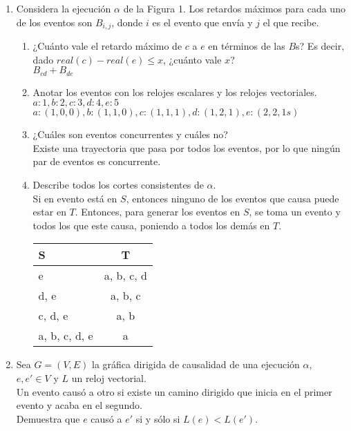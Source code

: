 \documentclass[12pt,a4paper]{report}
\begin{document}
\begin{enumerate}
	\item {
		Considera la ejecución $\alpha$ de la Figura 1. Los retardos máximos
		para cada uno de los eventos son $B_{i, j}$, donde $i$ es el evento
		que envía y $j$ el que recibe.
		\begin{enumerate}
			\item {
				¿Cuánto vale el retardo máximo de $c$ a $e$ en términos de
				las $B$s? Es decir, dado $real(c)-real(e) \leq x$, ¿cuánto
				vale $x$?\\
				$B_{cd} + B_{de}$
			}

			\item {
				Anotar los eventos con los relojes escalares y los relojes
				vectoriales.\\
				$a:1, b:2, c:3, d:4, e:5$\\
				$a:(1, 0, 0), b:(1, 1, 0), c:(1, 1, 1), d:(1, 2, 1), e:(2, 2, 1s)$
			}

			\item {
				¿Cuáles son eventos concurrentes y cuáles no?\\
				Existe una trayectoria que pasa por todos los eventos, por
				lo que ningún par de eventos es concurrente.
			}

			\item {
				Describe todos los cortes consistentes de $\alpha$.\\
				Si en evento está en $S$, entonces ninguno de los eventos
				que causa puede estar en $T$. Entonces, para generar los
				eventos en $S$, se toma un evento y todos los que este causa,
				poniendo a todos los demás en $T$.\\
				\begin{tabular}{| l | c |}
					\hline
						S & T \\ \hline
						e & a, b, c, d \\ \hline
						d, e & a, b, c \\ \hline
					    c, d, e & a, b \\ \hline
					    a, b, c, d, e & a \\
					\hline
				\end{tabular}
			}
		\end{enumerate}
	}

	\item {
		Sea $G = (V, E)$ la gráfica dirigida de causalidad de una ejecución
		$\alpha$, $e, e' \in V$ y $L$ un reloj vectorial.\\
		Un evento causó a otro si existe un camino dirigido que inicia en
		el primer evento y acaba en el segundo.\\
		Demuestra que $e$ causó a $e'$ si y sólo si $L(e) < L(e')$.
	}


\end{enumerate}
\end{document}

